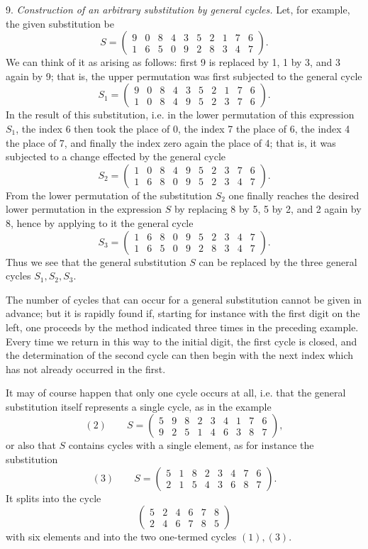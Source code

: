 \documentclass[10pt]{article}
\begin{document}
9. \emph{Construction of an arbitrary substitution by general cycles.} Let, for example, the given substitution be
\[
S=\begin{pmatrix}9&0&8&4&3&5&2&1&7&6\\1&6&5&0&9&2&8&3&4&7\end{pmatrix}.
\]
We can think of it as arising as follows: first 9 is replaced by 1, 1 by 3, and 3 again by 9; that is, the upper permutation was first subjected to the general cycle
\[
S_1=\begin{pmatrix}9&0&8&4&3&5&2&1&7&6\\1&0&8&4&9&5&2&3&7&6\end{pmatrix}.
\]
In the result of this substitution, i.e. in the lower permutation of this expression \(S_1\), the index 6 then took the place of 0, the index 7 the place of 6, the index 4 the place of 7, and finally the index zero again the place of 4; that is, it was subjected to a change effected by the general cycle
\[
S_2=\begin{pmatrix}1&0&8&4&9&5&2&3&7&6\\1&6&8&0&9&5&2&3&4&7\end{pmatrix}.
\]
From the lower permutation of the substitution \(S_2\) one finally reaches the desired lower permutation in the expression \(S\) by replacing 8 by 5, 5 by 2, and 2 again by 8, hence by applying to it the general cycle
\[
S_3=\begin{pmatrix}1&6&8&0&9&5&2&3&4&7\\1&6&5&0&9&2&8&3&4&7\end{pmatrix}.
\]
Thus we see that the general substitution \(S\) can be replaced by the three general cycles \(S_1,S_2,S_3\).

The number of cycles that can occur for a general substitution cannot be given in advance; but it is rapidly found if, starting for instance with the first digit on the left, one proceeds by the method indicated three times in the preceding example. Every time we return in this way to the initial digit, the first cycle is closed, and the determination of the second cycle can then begin with the next index which has not already occurred in the first.

It may of course happen that only one cycle occurs at all, i.e. that the general substitution itself represents a single cycle, as in the example
\[
(2)\qquad S=\begin{pmatrix}5&9&8&2&3&4&1&7&6\\9&2&5&1&4&6&3&8&7\end{pmatrix},
\]
or also that \(S\) contains cycles with a single element, as for instance the substitution
\[
(3)\qquad S=\begin{pmatrix}5&1&8&2&3&4&7&6\\2&1&5&4&3&6&8&7\end{pmatrix}.
\]
It splits into the cycle
\[
\begin{pmatrix}5&2&4&6&7&8\\2&4&6&7&8&5\end{pmatrix}
\]
with six elements and into the two one-termed cycles \((1),(3)\).
\end{document}

